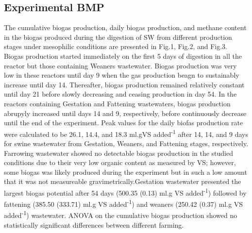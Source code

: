 \subsection{Experimental BMP}
The cumulative biogas production, daily biogas production, and methane content in the biogas produced during the digestion of SW from different production stages under mesophilic conditions are presented in Fig.1, Fig.2, and Fig.3.\\
Biogas production started immediately on the first 5 days of digestion in all the reactor but those containing Weaners wastewater. Biogas production was very low in these reactors until day 9 when the gas production beagn to sustainably increase until day 14. Thereafter, biogas production remained relatively constant until day 21 before slowly decreasing and ceasing production in day 54. In the reactors containing Gestation and Fattening wastewaters, biogas production abrupyly increased until days 14 and 9, respectively, before continuously decrease until the end of the experiment. Peak values for the daily biofas production rate were calculated to be 26.1, 14.4, and 18.3 ml.gVS added\textsuperscript{-1} after 14, 14, and 9 days for swine wastewater from Gestation, Weaners, and Fattening stages, respectively.
Farrowing wastewater showed no detectable biogas production in the studied conditions due to their very low organic content as measured by VS; however, some biogas was likely produced during the experiment but in such a low amount that it was not measureable gravimetrically.Gestation wastewater presented the largest biogas potential after 54 days (500.35 (0.13) ml.g VS added\textsuperscript{-1}) followed by fattening (385.50 (333.71) ml.g VS added\textsuperscript{-1}) and weaners (250.42 (0.37) ml.g VS added\textsuperscript{-1}) wastewater.   ANOVA on the cumulative biogas production showed no statistically significant differences between different farming.\\
